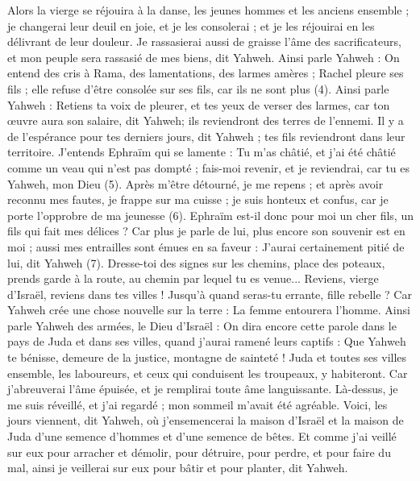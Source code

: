 \begin{multicols}{2}
Alors la vierge se réjouira à la danse, les jeunes hommes et les anciens ensemble ; je changerai leur deuil en joie, et je les consolerai ; et je les réjouirai en les délivrant de leur douleur.
Je rassasierai aussi de graisse l'âme des sacrificateurs, et mon peuple sera rassasié de mes biens, dit Yahweh.
Ainsi parle Yahweh : On entend des cris à Rama, des lamentations, des larmes amères ; Rachel pleure ses fils ; elle refuse d'être consolée sur ses fils, car ils ne sont plus\FTNT{} (4).
Ainsi parle Yahweh : Retiens ta voix de pleurer, et tes yeux de verser des larmes, car ton œuvre aura son salaire, dit Yahweh; ils reviendront des terres de l'ennemi.
Il y a de l'espérance pour tes derniers jours, dit Yahweh ; tes fils reviendront dans leur territoire.
J'entends Ephraïm qui se lamente : Tu m'as châtié, et j'ai été châtié comme un veau qui n’est pas dompté ; fais-moi revenir, et je reviendrai, car tu es Yahweh, mon Dieu\FTNT{} (5).
Après m’être détourné, je me repens ; et après avoir reconnu mes fautes, je frappe sur ma cuisse ; je suis honteux et confus, car je porte l'opprobre de ma jeunesse\FTNT{} (6).
Ephraïm est-il donc pour moi un cher fils, un fils qui fait mes délices ? Car plus je parle de lui, plus encore son souvenir est en moi ; aussi mes entrailles sont émues en sa faveur : J'aurai certainement pitié de lui, dit Yahweh\FTNT{} (7).
Dresse-toi des signes sur les chemins, place des poteaux, prends garde à la route, au chemin par lequel tu es venue... Reviens, vierge d'Israël, reviens dans tes villes !
Jusqu’à quand seras-tu errante, fille rebelle ? Car Yahweh crée une chose nouvelle sur la terre : La femme entourera l'homme.
Ainsi parle Yahweh des armées, le Dieu d'Israël : On dira encore cette parole dans le pays de Juda et dans ses villes, quand j'aurai ramené leurs captifs : Que Yahweh te bénisse, demeure de la justice, montagne de sainteté !
Juda et toutes ses villes ensemble, les laboureurs, et ceux qui conduisent les troupeaux, y habiteront.
Car j'abreuverai l'âme épuisée, et je remplirai toute âme languissante.
Là-dessus, je me suis réveillé, et j'ai regardé ; mon sommeil m’avait été agréable.
Voici, les jours viennent, dit Yahweh, où j’ensemencerai la maison d'Israël et la maison de Juda d’une semence d'hommes et d’une semence de bêtes.
Et comme j'ai veillé sur eux pour arracher et démolir, pour détruire, pour perdre, et pour faire du mal, ainsi je veillerai sur eux pour bâtir et pour planter, dit Yahweh.

\end{multicols}

